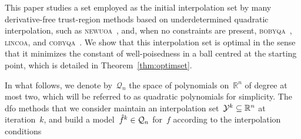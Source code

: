 \documentclass{article}
\numberwithin{equation}{section}
\theoremstyle{definition}
\theoremstyle{plain}
\theoremstyle{remark}
\newcommand*{\obj}{f}
\newcommand*{\objm}[1][]{\hat{\obj}\ifblank{#1}{}{^{#1}}}
\newcommand*{\qpoly}{\mathcal{Q}_n}
\newcommand*{\R}{\mathbb{R}}
\newcommand*{\solvername}[1]{\textsc{#1}\xspace}
\newcommand*{\xpt}[1][]{\mathcal{Y}\ifblank{#1}{}{^{#1}}}
\begin{document}
This paper studies a set employed as the initial interpolation set by many derivative-free trust-region methods based on underdetermined quadratic interpolation, such as \solvername{newuoa}~\cite{Powell_2006}, and, when no constraints are present, \solvername{bobyqa}~\cite{Powell_2009}, \solvername{lincoa}, and \solvername{cobyqa}~\cite{Ragonneau_2022,Ragonneau_Zhang_2023}.
We show that this interpolation set is optimal in the sense that it minimizes the constant of well-poisedness in a ball centred at the starting point, which is detailed in Theorem~\ref{thm:optimset}.

%
In what follows, we denote by~$\qpoly$ the space of polynomials on~$\R^n$ of degree at most two, which will be referred to as quadratic polynomials for simplicity.
The \gls{dfo} methods that we consider maintain an interpolation set~$\xpt[k] \subseteq \R^n$ at iteration~$k$, and build a model~$\objm[k]\in\qpoly$ for~$\obj$ according to the interpolation conditions
\end{document}
